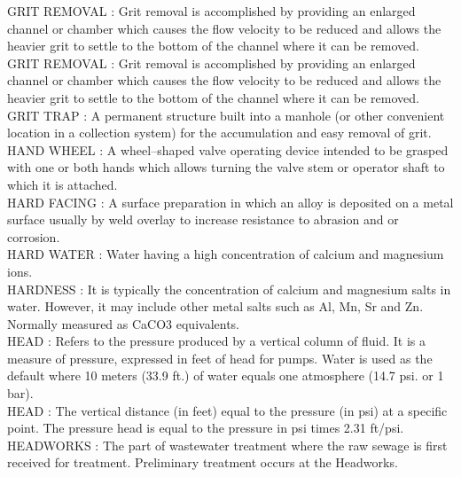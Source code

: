 GRIT REMOVAL :  Grit removal is accomplished by providing an enlarged channel or chamber which causes the flow velocity to be reduced and allows the heavier grit to settle to the bottom of the channel where it can be removed.\\
\vspace{0.15cm}
GRIT REMOVAL :  Grit removal is accomplished by providing an enlarged channel or chamber which causes the flow velocity to be reduced and allows the heavier grit to settle to the bottom of the channel where it can be removed.\\
\vspace{0.15cm}
GRIT TRAP :  A permanent structure built into a manhole (or other convenient location in a collection system) for the accumulation and easy removal of grit. \\
\vspace{0.15cm}
HAND WHEEL :   A wheel–shaped valve operating device intended to be grasped with one or both hands which allows turning the valve stem or operator shaft to which it is attached.\\
\vspace{0.15cm}
HARD FACING :   A surface preparation in which an alloy is deposited on a metal surface usually by weld overlay to increase resistance to abrasion and or corrosion.\\
\vspace{0.15cm}
HARD WATER :  Water having a high concentration of calcium and magnesium ions.\\
\vspace{0.15cm}
HARDNESS :  It is typically the concentration of calcium and magnesium salts in water. However, it may include other metal salts such as Al, Mn, Sr and Zn. Normally measured as CaCO3 equivalents.\\
\vspace{0.15cm}
HEAD :   Refers to the pressure produced by a vertical column of fluid.  It is a measure of pressure, expressed in feet of head for pumps. Water is used as the default where 10 meters (33.9 ft.) of water equals one atmosphere (14.7 psi. or 1 bar).\\
\vspace{0.15cm}
HEAD :  The vertical distance (in feet) equal to the pressure (in psi) at a specific point. The pressure head is equal to the pressure in psi times 2.31 ft/psi.\\
\vspace{0.15cm}
HEADWORKS :   The part of wastewater treatment where the raw sewage is first received for treatment.  Preliminary treatment occurs at the Headworks.\\
